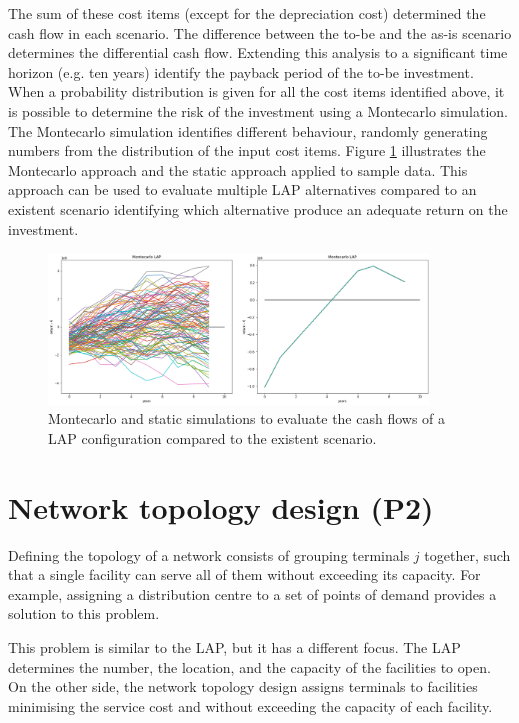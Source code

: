 The sum of these cost items (except for the depreciation cost) determined the cash flow in each scenario. The difference between the to-be and the as-is scenario determines the differential cash flow. Extending this analysis to a significant time horizon (e.g. ten years) identify the payback period of the to-be investment. When a probability distribution is given for all the cost items identified above, it is possible to determine the risk of the investment using a Montecarlo simulation. The Montecarlo simulation identifies different behaviour, randomly generating numbers from the distribution of the input cost items. Figure \ref{fig_LAP} illustrates the Montecarlo approach and the static approach applied to sample data. This approach can be used to evaluate multiple LAP alternatives compared to an existent scenario identifying which alternative produce an adequate return on the investment.

\begin{figure}[hbt!]
\centering
\includegraphics[width=0.9\textwidth]{SectionDistribution/design_figures/fig_LAP.png}
\captionsetup{type=figure}
\caption{Montecarlo and static simulations to evaluate the cash flows of a LAP configuration compared to the existent scenario.}
\label{fig_LAP}
\end{figure}


\section{Network topology design (P2)}
Defining the topology of a network consists of grouping terminals $j$ together, such that a single facility can serve all of them without exceeding its capacity. For example, assigning a distribution centre to a set of points of demand provides a solution to this problem.\par

This problem is similar to the LAP, but it has a different focus. The LAP determines the number, the location, and the capacity of the facilities to open. On the other side, the network topology design assigns terminals to facilities minimising the service cost and without exceeding the capacity of each facility. 

